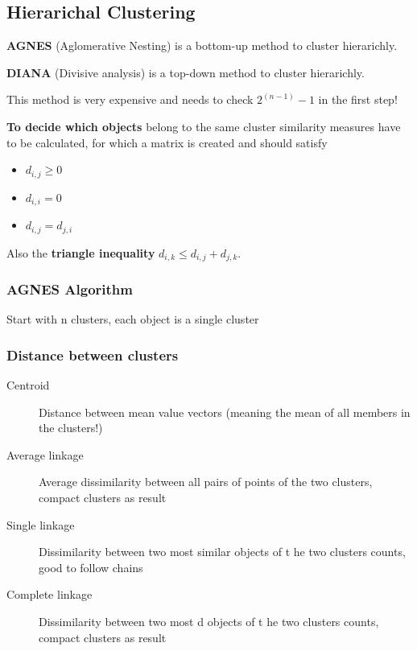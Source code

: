 \documentclass[fleqn, oneside, 10pt, titlepage]{article}
\begin{document}
\subsection{Hierarichal Clustering}
\textbf{AGNES} (Aglomerative Nesting) is a bottom-up method to cluster hierarichly.

\textbf{DIANA} (Divisive analysis) is a top-down method to cluster hierarichly.

This method is very expensive and needs to check $2^(n-1)-1$ in the first step!

\textbf{To decide which objects} belong to the same cluster similarity measures have to be calculated, for which a matrix is created and should satisfy

\begin{itemize}
	\item $d_{i,j} \geq 0$
	\item $d_{i,i} = 0$
	\item $d_{i,j} = d_{j,i}$
\end{itemize}

Also the \textbf{triangle inequality} $d_{i,k} \leq d_{i,j} + d_{j,k}$.

\subsubsection{AGNES Algorithm}
\begin{algorithm}
	\SetAlgoLined
	
	Start with n clusters, each object is a single cluster\;
\end{algorithm}

\subsubsection{Distance between clusters}
\begin{description}
	\item[Centroid] Distance between mean value vectors (meaning the mean of all members in the clusters!)
	\item[Average linkage] Average dissimilarity between all pairs of points of the two clusters, compact clusters as result
	\item[Single linkage] Dissimilarity between two most similar objects of t he two clusters counts, good to follow chains
	\item[Complete linkage] Dissimilarity between two most d objects of t he two clusters counts, compact clusters as result
\end{description}
\end{document}
